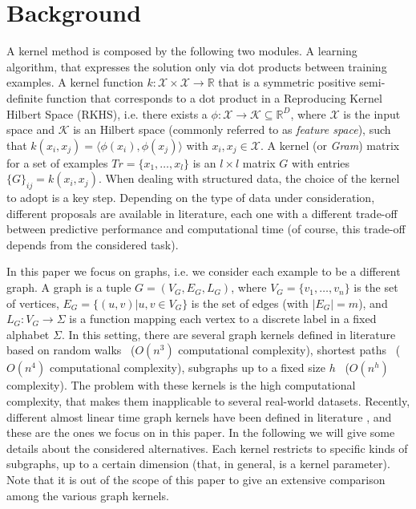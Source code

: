 \documentclass{esannV2}
\newcommand{\1}{{\bf 1}}
\begin{document}
\section{Background}
A kernel method is composed by the following two modules.
A learning algorithm, that expresses the solution only via dot products between training examples.
A kernel function ${k}: \mathcal{X} \times \mathcal{X} \rightarrow \mathbb{R}$ that is a symmetric positive semi-definite function that corresponds to a dot product in a Reproducing Kernel Hilbert Space (RKHS), i.e. there exists a $\phi: \mathcal{X} \rightarrow \mathcal{K} \subseteq \mathbb{R}^D$, where $\mathcal{X}$ is the input space and $\mathcal{K}$ is an Hilbert space (commonly referred to as \textit{feature space}), such that $k(x_i,x_j) = \langle \phi(x_i),\phi(x_j) \rangle$ with $x_i,x_j \in \mathcal{X}$. %
A kernel (or \textit{Gram}) matrix for a set of examples $Tr=\{x_1, \ldots, x_l\}$ is an $l \times l$ matrix $G$ with entries $\{G\}_{ij}=k(x_i,x_j)$.
When dealing with structured data, the choice of the kernel to adopt is a key step. Depending on the type of data under consideration, different proposals are available in literature, each one with a different trade-off between predictive performance and computational time (of course, this trade-off depends from the considered task).

In this paper we focus on graphs, i.e. we consider each example to be a different graph.
A graph is a tuple $G=(V_G,E_G,L_G)$, where $V_G=\{v_1,\ldots,v_n\}$ is the set of vertices, $E_G=\{(u,v) | u,v \in V_G\}$ is the set of edges (with $|E_G|=m$), and $L_G: V_G \rightarrow \Sigma$ is a function mapping each vertex to a discrete label in a fixed alphabet $\Sigma$.
In this setting, there are several graph kernels defined in literature based on random walks~\cite{Kashima03marginalizedkernels,Mahe2004} ($O(n^3)$ computational complexity), shortest paths~\cite{Kriegel05shortestpath} ($O(n^4)$ computational complexity), subgraphs up to a fixed size $h$~\cite{Shervashidze2009} ($O(n^h)$ complexity). The problem with these kernels is the high computational complexity, that makes them inapplicable to several real-world datasets.
Recently, different almost linear time graph kernels have been defined in literature \cite{Heinonen2009,Costa2010,Shervashidze2011,Dasan2012,DaSanMartino2016}, and these are the ones we focus on in this paper.
In the following we will give some details about the considered alternatives.
Each kernel restricts to specific kinds of subgraphs, up to a certain dimension (that, in general, is a kernel parameter).
Note that it is out of the scope of this paper to give an extensive comparison among the various graph kernels. 
\end{document}
